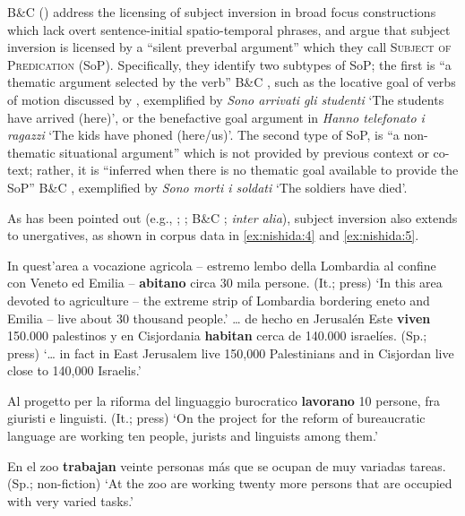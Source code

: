 \documentclass[output=paper,colorlinks,citecolor=brown,
]{langscibook}
\begin{document}
B\&C (\citeyear[2]{bentley2018silent}) address the licensing of subject inversion in broad focus constructions which lack overt sentence-initial spatio-temporal phrases, and argue that subject inversion is licensed by a ``silent preverbal argument'' which they call \textsc{Subject of Predication} (SoP). Specifically, they identify two subtypes of SoP; the first is ``a thematic argument selected by the verb'' B\&C \citeyear[2]{bentley2018silent}, such as the locative goal of verbs of motion discussed by \citet{tortora1997}, exemplified by \textit{Sono arrivati gli studenti} 
`The students have arrived (here)', or the benefactive goal argument in \textit{Hanno telefonato i ragazzi} `The kids have phoned (here/us)'. The second type of SoP, is ``a non-thematic situational argument'' which is not provided by previous context or co-text; rather, it is ``inferred when there is no thematic goal available to provide the SoP'' B\&C \citeyear{bentley2018silent}, exemplified by \textit{Sono morti i soldati} 
`The soldiers have died'.

As has been pointed out (e.g., \citealt{torrego1989}; \citealt{pinto1997}; B\&C \citeyear{bentley2018silent}; \textit{inter alia}), subject inversion also extends to unergatives, as shown in corpus data in \ref{ex:nishida:4} and \ref{ex:nishida:5}.


\begin{exe} %
    \ex\label{ex:nishida:4} 
    \begin{xlist} 
        \ex\label{ex:nishida:4a} In quest’area a vocazione agricola – estremo lembo della Lombardia al confine con 		Veneto ed Emilia – \textbf{abitano} circa 30 mila persone. (It.; press)
         \glt ‘In this area devoted to agriculture – the extreme strip of Lombardia bordering 	eneto and Emilia – live about 30 thousand people.’
        \ex\label{ex:nishida:4b} {\dots} de hecho en Jerusalén Este \textbf{viven} 150.000 palestinos y en Cisjordania \textbf{habitan} cerca de 140.000 israelíes. (Sp.; press)
         \glt ‘{\dots}  in fact in East Jerusalem live 150,000 Palestinians and in Cisjordan live close to 				140,000 Israelis.’  
\end{xlist}
\end{exe}


\begin{exe} %
    \ex\label{ex:nishida:5} 
    \begin{xlist} 
        \ex\label{ex:nishida:5a} Al progetto per la riforma del linguaggio burocratico \textbf{lavorano} 10 persone, fra giuristi e 			linguisti. (It.; press)
        \glt ‘On the project for the reform of bureaucratic language are working ten people, jurists and linguists among them.’ 
          
        \ex\label{ex:nishida:5b} En el zoo \textbf{trabajan} veinte personas más que se ocupan de muy variadas tareas. (Sp.; non-fiction) 
        \glt ‘At the zoo are working twenty more persons that are occupied with very varied tasks.’ 
          
\end{xlist}
\end{exe}
\end{document}
